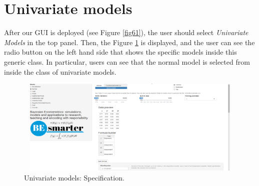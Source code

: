 \section{Univariate models}\label{secGUI2}
After our GUI is deployed (see Figure \ref{fig61}), the user should select \textit{Univariate Models} in the top panel. Then, the Figure \ref{fig62} is displayed, and the user can see the radio button on the left hand side that shows the specific models inside this generic class. In particular, users can see that the normal model is selected from inside the class of univariate models.

\begin{figure}
	\includegraphics[width=340pt, height=130pt]{Chapters/chapterGUI/figures/Figure2.png}
	\caption[List of figure caption goes here]{Univariate models: Specification.}\label{fig62}
\end{figure}

